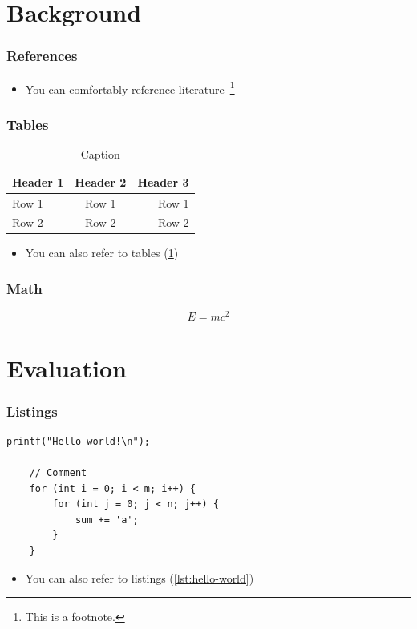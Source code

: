 \documentclass[
	aspectratio=169,
	compress,
]{beamer}
\newcommand{\navframetitle}[1]{\frametitle{#1\hfill{\footnotesize\lastsection{}}}}
\begin{document}
\section{Background}
\label{sec:background}

\begin{frame}
	\navframetitle{References}

	\begin{itemize}
		\item You can comfortably reference literature~\cite{DBLP:journals/superfri/DuweLMSF0B020}\footnote{This is a footnote.}
	\end{itemize}
\end{frame}

\begin{frame}
	\navframetitle{Tables}

	\begin{table}[ht]
		\centering
		\begin{tabular}{|l|c|r|}
			\hline
			\textbf{Header 1} & \textbf{Header 2} & \textbf{Header 3} \\
			\hline
			\hline
			Row 1 & Row 1 & Row 1 \\
			Row 2 & Row 2 & Row 2 \\
			\hline
		\end{tabular}
		\caption{Caption}
		\label{tab:table}
	\end{table}

	\begin{itemize}
		\item You can also refer to tables (\cref{tab:table})
	\end{itemize}
\end{frame}

\begin{frame}
	\navframetitle{Math}

	\[
		E = m c^2
	\]
\end{frame}

\section{Evaluation}
\label{sec:evaluation}

\begin{frame}[fragile]
	\navframetitle{Listings}

	\begin{lstlisting}[caption=Caption,label=lst:hello-world]
	printf("Hello world!\n");

	// Comment
	for (int i = 0; i < m; i++) {
		for (int j = 0; j < n; j++) {
			sum += 'a';
		}
	}
	\end{lstlisting}

	\begin{itemize}
		\item You can also refer to listings (\cref{lst:hello-world})
	\end{itemize}
\end{frame}
\end{document}
